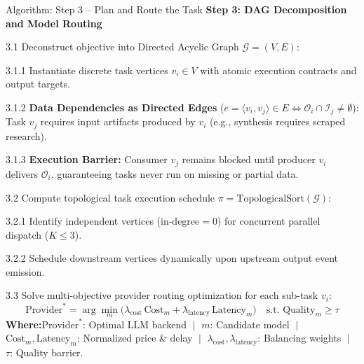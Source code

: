 \documentclass[aspectratio=169,10pt]{beamer}
\begin{document}
\begin{frame}[t]{Algorithm: Step 3 -- Plan and Route the Task}
\vspace{-0.15em}
{\large\bfseries\color{lavenderDark}Step 3: DAG Decomposition and Model Routing}
\vspace{0.15em}

\begin{algolist}
  \item[3.1] Deconstruct objective into Directed Acyclic Graph $\mathcal{G} = (V, E)$:
    \begin{algosublist}
      \item[3.1.1] Instantiate discrete task vertices $v_i \in V$ with atomic execution contracts and output targets.
      \item[3.1.2] \textbf{Data Dependencies as Directed Edges} ($e = \langle v_i, v_j \rangle \in E \iff \mathcal{O}_i \cap \mathcal{I}_j \neq \emptyset$): Task $v_j$ requires input artifacts produced by $v_i$ (e.g., synthesis requires scraped research).
      \item[3.1.3] \textbf{Execution Barrier:} Consumer $v_j$ remains blocked until producer $v_i$ delivers $\mathcal{O}_i$, guaranteeing tasks never run on missing or partial data.
    \end{algosublist}
  \item[3.2] Compute topological task execution schedule $\pi = \mathrm{TopologicalSort}(\mathcal{G})$:
    \begin{algosublist}
      \item[3.2.1] Identify independent vertices ($\text{in-degree} = 0$) for concurrent parallel dispatch ($K \le 3$).
      \item[3.2.2] Schedule downstream vertices dynamically upon upstream output event emission.
    \end{algosublist}
  \item[3.3] Solve multi-objective provider routing optimization for each sub-task $v_i$:
    \vspace{-0.2em}
    $$\text{Provider}^* = \arg\min_m \Big(\lambda_{\text{cost}} \, \text{Cost}_m + \lambda_{\text{latency}} \, \text{Latency}_m\Big) \quad \text{s.t. } \text{Quality}_m \ge \tau$$
    \vspace{-0.2em}
    {\footnotesize\color{prismDark}%
      \textbf{\color{lavenderDark}Where:}\enspace $\text{Provider}^*$: Optimal LLM backend $\;\vert\;$ $m$: Candidate model $\;\vert\;$ $\text{Cost}_m, \text{Latency}_m$: Normalized price \& delay $\;\vert\;$ $\lambda_{\text{cost}}, \lambda_{\text{latency}}$: Balancing weights $\;\vert\;$ $\tau$: Quality barrier.}

\end{algolist}
\end{frame}
\end{document}
